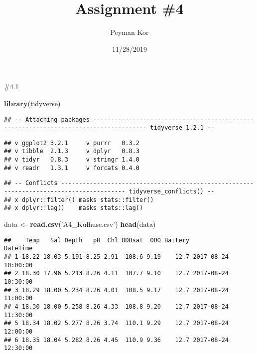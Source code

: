 \documentclass[]{article}
\title{Assignment \#4}
\author{Peyman Kor}
\date{11/28/2019}
\newenvironment{Shaded}{\begin{snugshade}}{\end{snugshade}}
\newcommand{\KeywordTok}[1]{\textcolor[rgb]{0.13,0.29,0.53}{\textbf{#1}}}
\newcommand{\NormalTok}[1]{#1}
\newcommand{\StringTok}[1]{\textcolor[rgb]{0.31,0.60,0.02}{#1}}
\begin{document}
\maketitle

\#4.1

\begin{Shaded}
\begin{Highlighting}[]
\KeywordTok{library}\NormalTok{(tidyverse)}
\end{Highlighting}
\end{Shaded}

\begin{verbatim}
## -- Attaching packages ------------------------------------------------------------------------------------- tidyverse 1.2.1 --
\end{verbatim}

\begin{verbatim}
## v ggplot2 3.2.1     v purrr   0.3.2
## v tibble  2.1.3     v dplyr   0.8.3
## v tidyr   0.8.3     v stringr 1.4.0
## v readr   1.3.1     v forcats 0.4.0
\end{verbatim}

\begin{verbatim}
## -- Conflicts ---------------------------------------------------------------------------------------- tidyverse_conflicts() --
## x dplyr::filter() masks stats::filter()
## x dplyr::lag()    masks stats::lag()
\end{verbatim}

\begin{Shaded}
\begin{Highlighting}[]
\NormalTok{data <-}\StringTok{ }\KeywordTok{read.csv}\NormalTok{(}\StringTok{'A4_Kulhuse.csv'}\NormalTok{)}
\KeywordTok{head}\NormalTok{(data)}
\end{Highlighting}
\end{Shaded}

\begin{verbatim}
##    Temp   Sal Depth   pH  Chl ODOsat  ODO Battery            DateTime
## 1 18.22 18.03 5.191 8.25 2.91  108.6 9.19    12.7 2017-08-24 10:00:00
## 2 18.30 17.96 5.213 8.26 4.11  107.7 9.10    12.7 2017-08-24 10:30:00
## 3 18.29 18.00 5.234 8.26 4.01  108.5 9.17    12.7 2017-08-24 11:00:00
## 4 18.30 18.00 5.258 8.26 4.33  108.8 9.20    12.7 2017-08-24 11:30:00
## 5 18.34 18.02 5.277 8.26 3.74  110.1 9.29    12.7 2017-08-24 12:00:00
## 6 18.35 18.04 5.282 8.26 4.45  110.9 9.36    12.7 2017-08-24 12:30:00
\end{verbatim}
\end{document}
